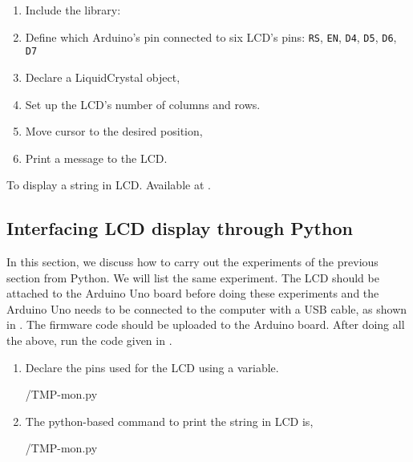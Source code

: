 \begin{enumerate}
  \item Include the library: 

\item Define which Arduino's pin connected to six LCD's pins:
{\tt RS}, {\tt EN}, {\tt D4}, {\tt D5}, {\tt D6}, {\tt D7}

\item Declare a LiquidCrystal object,

\item Set up the LCD's number of columns and rows.

\item Move cursor to the desired position,

\item Print a message to the LCD.

\end{enumerate}

\begin{ardcode}
  {To display a string in LCD.  Available at
    .}
  \label{ard:lcd}
  
\end{ardcode}

\subsection{Interfacing LCD display through Python}
In this section, we discuss how to carry out the experiments of
the previous section from Python. We will list the same
experiment. The LCD should be attached to the Arduino Uno board
before
doing these experiments and the Arduino Uno needs to be
connected to the computer with a USB cable, as shown in
. The firmware code should be uploaded to
the Arduino board.
After doing all the above, run the code given in .
\begin{enumerate}
  \item Declare the pins used for the LCD using a variable.
        
        {\LocTMPpycode/TMP-mon.py} 

  \item The python-based command to print the string in LCD is,

        {\LocTMPpycode/TMP-mon.py} 
\end{enumerate}

